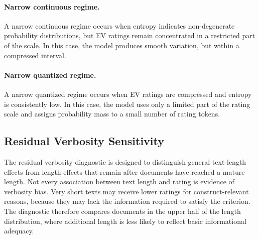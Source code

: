 \paragraph{Narrow continuous regime.}
A narrow continuous regime occurs when entropy indicates non-degenerate probability distributions, but EV ratings remain concentrated in a restricted part of the scale. In this case, the model produces smooth variation, but within a compressed interval. 


\paragraph{Narrow quantized regime.}
A narrow quantized regime occurs when EV ratings are compressed and entropy is consistently low. In this case, the model uses only a limited part of the rating scale and assigns probability mass to a small number of rating tokens. 


\subsection{Residual Verbosity Sensitivity}
\label{app:residual_verbosity_sensitivity}

The residual verbosity diagnostic is designed to distinguish general text-length effects from length effects that remain after documents have reached a mature length. Not every association between text length and rating is evidence of verbosity bias. Very short texts may receive lower ratings for construct-relevant reasons, because they may lack the information required to satisfy the criterion. The diagnostic therefore compares documents in the upper half of the length distribution, where additional length is less likely to reflect basic informational adequacy.





